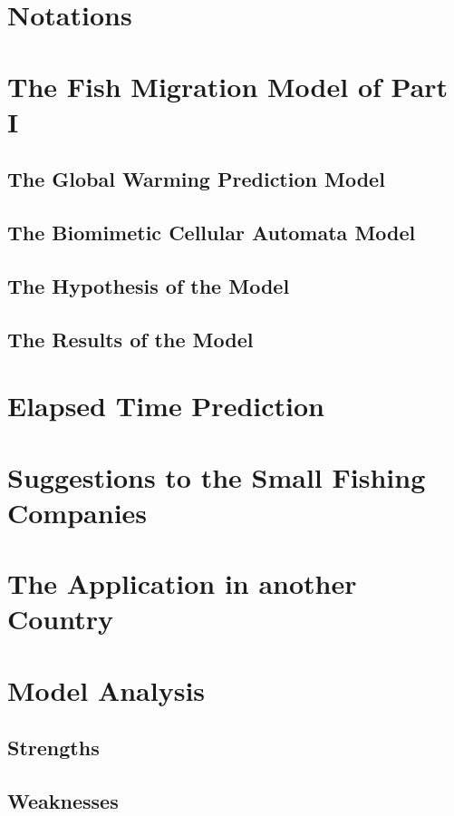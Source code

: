 \documentclass{mcmthesis}
\begin{document}
\section{Notations}


\section{The Fish Migration Model of Part I}
\subsection{The Global Warming Prediction Model}
\subsection{The Biomimetic Cellular Automata Model}
\subsection{The Hypothesis of the Model}
\subsection{The Results of the Model}

\section{Elapsed Time Prediction}


\section{Suggestions to the Small Fishing Companies}


\section{The Application in another Country}

\section{Model Analysis}
\subsection{Strengths}

\subsection{Weaknesses}
\end{document}
